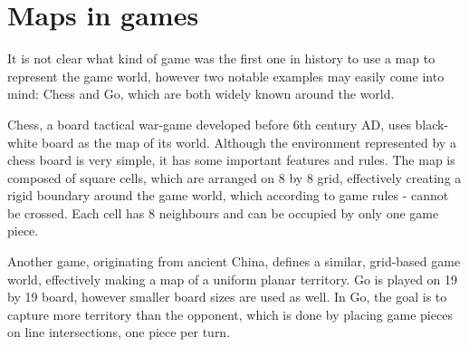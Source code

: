 \documentclass[12pt]{report}
\begin{document}
\section{Maps in games} 

It is not clear what kind of game was the first one in history to use a map to represent the game world, however two notable examples may easily come into mind: Chess and Go, which are both widely known around the world. 

Chess, a board tactical war-game developed before 6th century AD, uses black-white board as the map of its world. Although the environment represented by a chess board is very simple, it has some important features and rules. The map is composed of square cells, which are arranged on 8 by 8 grid, effectively creating a rigid boundary around the game world, which according to game rules - cannot be crossed. Each cell has 8 neighbours and can be occupied by only one game piece.

Another game, originating from ancient China, defines a similar, grid-based game world, effectively making a map of a uniform planar territory. Go is played on 19 by 19 board, however smaller board sizes are used as well. In Go, the goal is to capture more territory than the opponent, which is done by placing game pieces on line intersections, one piece per turn.
\end{document}
